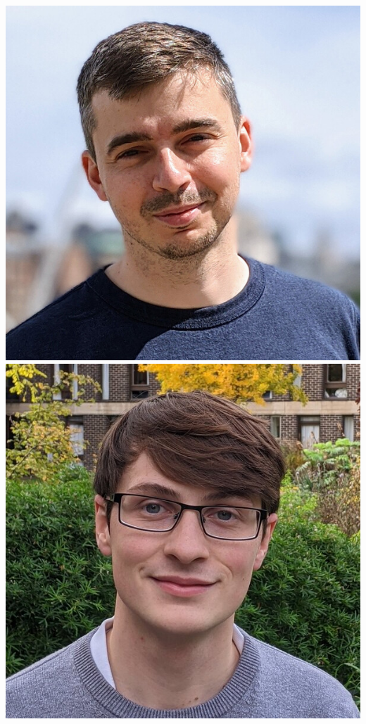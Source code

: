 \documentclass[aspectratio=169]{beamer}
\begin{document}
\begin{frame}
\begin{columns}
        \includegraphics[width=\textwidth]{people/david_yallup}
        \includegraphics[width=\textwidth]{people/thomas_gessey-jones}
    \end{columns}
\end{frame}
\end{document}

